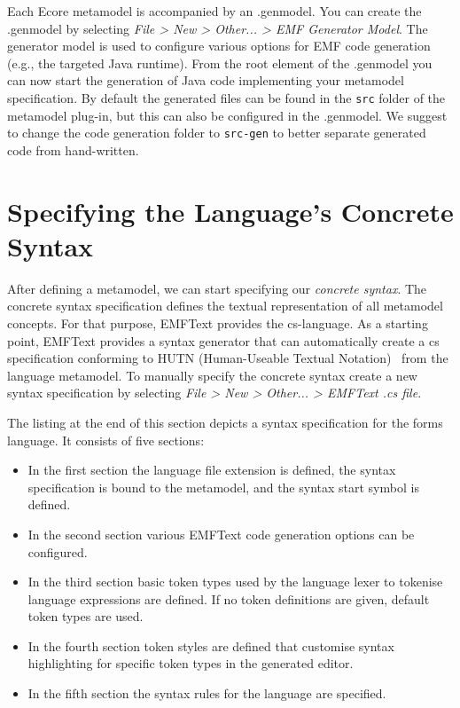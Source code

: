 Each Ecore metamodel is accompanied by an .genmodel. You can create the
	.genmodel by selecting \emph{File > New > Other... > EMF Generator Model}.
	The generator model is used to configure various options for EMF code
	generation (e.g., the targeted Java runtime). From the root element of
	the .genmodel you can now start the generation of Java code implementing your metamodel
	specification. By default the generated files can be found in the \texttt{src}
	folder of the metamodel plug-in, but this can also be configured in the
	.genmodel. We suggest to change the code generation folder to \texttt{src-gen}
	to better separate generated code from hand-written.

\section{Specifying the Language's Concrete Syntax}
\label{sec:process_specification}

	After defining a metamodel, we can start specifying our
	\emph{concrete syntax}. The concrete syntax specification defines 
	the textual representation of all metamodel
	concepts. For that purpose, EMFText provides the cs-language. 
	As a starting point, EMFText provides a syntax generator that can
	automatically create a cs specification conforming to HUTN (Human-Useable
	Textual Notation)~\cite{HUTN} from the language metamodel. 
	To manually specify the concrete syntax create a
	new syntax specification by selecting \emph{File > New > Other... > EMFText .cs
	file}.

	\noindent The listing at the end of this section depicts a syntax specification
	for the forms language. It consists of five sections: 
	\begin{itemize}
	  \item In the first section the language file
		extension is defined, the syntax specification is bound to the metamodel, 
		and the syntax start symbol is defined.
	  \item In the second section various EMFText code generation options can be
	  	configured.
	  \item  In the third section basic token types used by the language
	  	lexer to tokenise language expressions are defined. If no token definitions
	 	are given, default token types are used. 	
	  \item In the fourth section token styles are defined that customise syntax
	  	highlighting for specific token types in the generated editor.
	  \item In the fifth section the syntax rules for the language are specified.	
	\end{itemize}
	
